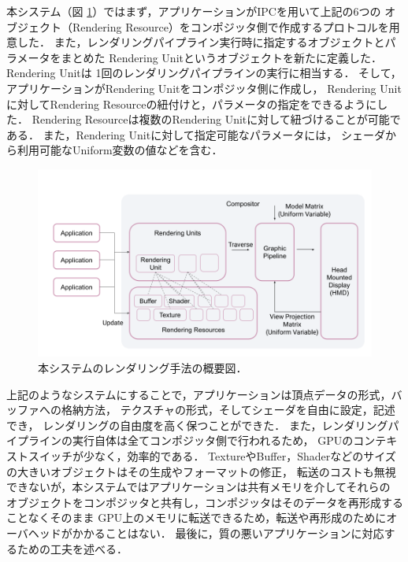 本システム（図 \ref{fig:rendering}）ではまず，アプリケーションがIPCを用いて上記の6つの
オブジェクト（Rendering Resource）をコンポジッタ側で作成するプロトコルを用意した．
また，レンダリングパイプライン実行時に指定するオブジェクトとパラメータをまとめた
Rendering Unitというオブジェクトを新たに定義した．Rendering Unitは
1回のレンダリングパイプラインの実行に相当する．
そして，アプリケーションがRendering Unitをコンポジッタ側に作成し，
Rendering Unitに対してRendering Resourceの紐付けと，パラメータの指定をできるようにした．
Rendering Resourceは複数のRendering Unitに対して紐づけることが可能である．
また，Rendering Unitに対して指定可能なパラメータには，
シェーダから利用可能なUniform変数の値などを含む．

\begin{figure}[htbp]
  \centering
  \includegraphics[keepaspectratio, width=1\linewidth]{figures/rendering.png}
  \caption{
    本システムのレンダリング手法の概要図．
  }
  \label{fig:rendering}
\end{figure}

上記のようなシステムにすることで，アプリケーションは頂点データの形式，バッファへの格納方法，
テクスチャの形式，そしてシェーダを自由に設定，記述でき，
レンダリングの自由度を高く保つことができた．
また，レンダリングパイプラインの実行自体は全てコンポジッタ側で行われるため，
GPUのコンテキストスイッチが少なく，効率的である．
TextureやBuffer，Shaderなどのサイズの大きいオブジェクトはその生成やフォーマットの修正，
転送のコストも無視できないが，本システムではアプリケーションは共有メモリを介してそれらの
オブジェクトをコンポジッタと共有し，コンポジッタはそのデータを再形成することなくそのまま
GPU上のメモリに転送できるため，転送や再形成のためにオーバヘッドがかかることはない．
最後に，質の悪いアプリケーションに対応するための工夫を述べる．

